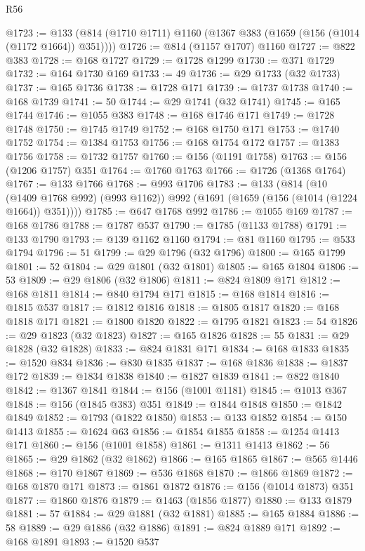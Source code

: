 \begin{lexlean}{R56}
\begin{coremodule}
{{{{{{{{{{{{{{{{{{{{{{{{{{{{{{{{{{{{{{{{{{{{{{{{{{{{{{{{{{{{{{{{{{{{{{{{{{{{{{{{{{{{{{{{{{{{{{{{{{{{{{{{{{{{{{{{{{{{{{{{{{{{{{{{{{{{{{{{{{{{{{{{{{{{{{{{{{{{{{{{{{{{{{{{{{{{{{{{{{{{{{{{{{{{{{{{{{{{{{{{{{{{{{{{{{{@1723 := @133 (@814 (@1710 @1711) @1160 (@1367 @383 (@1659 (@156 (@1014 (@1172 @1664)) @351))))
@1726 := @814 (@1157 @1707) @1160
@1727 := @822 @383
@1728 := @168 @1727
@1729 := @1728 @1299
@1730 := @371 @1729
@1732 := @164 @1730 @169
@1733 := 49
@1736 := @29 @1733 (@32 @1733)
@1737 := @165 @1736
@1738 := @1728 @171
@1739 := @1737 @1738
@1740 := @168 @1739
@1741 := 50
@1744 := @29 @1741 (@32 @1741)
@1745 := @165 @1744
@1746 := @1055 @383
@1748 := @168 @1746 @171
@1749 := @1728 @1748
@1750 := @1745 @1749
@1752 := @168 @1750 @171
@1753 := @1740 @1752
@1754 := @1384 @1753
@1756 := @168 @1754 @172
@1757 := @1383 @1756
@1758 := @1732 @1757
@1760 := @156 (@1191 @1758)
@1763 := @156 (@1206 @1757) @351
@1764 := @1760 @1763
@1766 := @1726 (@1368 @1764)
@1767 := @133 @1766
@1768 := @993 @1706
@1783 := @133
    (@814
      (@10 (@1409 @1768 @992) (@993 @1162))
      @992
      (@1691 (@1659 (@156 (@1014 (@1224 @1664)) @351))))
@1785 := @647 @1768 @992
@1786 := @1055 @169
@1787 := @168 @1786
@1788 := @1787 @537
@1790 := @1785 (@1133 @1788)
@1791 := @133 @1790
@1793 := @139 @1162 @1160
@1794 := @81 @1160
@1795 := @533 @1794
@1796 := 51
@1799 := @29 @1796 (@32 @1796)
@1800 := @165 @1799
@1801 := 52
@1804 := @29 @1801 (@32 @1801)
@1805 := @165 @1804
@1806 := 53
@1809 := @29 @1806 (@32 @1806)
@1811 := @824 @1809 @171
@1812 := @168 @1811
@1814 := @840 @1794 @171
@1815 := @168 @1814
@1816 := @1815 @537
@1817 := @1812 @1816
@1818 := @1805 @1817
@1820 := @168 @1818 @171
@1821 := @1800 @1820
@1822 := @1795 @1821
@1823 := 54
@1826 := @29 @1823 (@32 @1823)
@1827 := @165 @1826
@1828 := 55
@1831 := @29 @1828 (@32 @1828)
@1833 := @824 @1831 @171
@1834 := @168 @1833
@1835 := @1520 @834
@1836 := @830 @1835
@1837 := @168 @1836
@1838 := @1837 @172
@1839 := @1834 @1838
@1840 := @1827 @1839
@1841 := @822 @1840
@1842 := @1367 @1841
@1844 := @156 (@1001 @1181)
@1845 := @1013 @367
@1848 := @156 (@1845 @383) @351
@1849 := @1844 @1848
@1850 := @1842 @1849
@1852 := @1793 (@1822 @1850)
@1853 := @133 @1852
@1854 := @150 @1413
@1855 := @1624 @63
@1856 := @1854 @1855
@1858 := @1254 @1413 @171
@1860 := @156 (@1001 @1858)
@1861 := @1311 @1413
@1862 := 56
@1865 := @29 @1862 (@32 @1862)
@1866 := @165 @1865
@1867 := @565 @1446
@1868 := @170 @1867
@1869 := @536 @1868
@1870 := @1866 @1869
@1872 := @168 @1870 @171
@1873 := @1861 @1872
@1876 := @156 (@1014 @1873) @351
@1877 := @1860 @1876
@1879 := @1463 (@1856 @1877)
@1880 := @133 @1879
@1881 := 57
@1884 := @29 @1881 (@32 @1881)
@1885 := @165 @1884
@1886 := 58
@1889 := @29 @1886 (@32 @1886)
@1891 := @824 @1889 @171
@1892 := @168 @1891
@1893 := @1520 @537
}}}}}}}}}}}}}}}}}}}}}}}}}}}}}}}}}}}}}}}}}}}}}}}}}}}}}}}}}}}}}}}}}}}}}}}}}}}}}}}}}}}}}}}}}}}}}}}}}}}}}}}}}}}}}}}}}}}}}}}}}}}}}}}}}}}}}}}}}}}}}}}}}}}}}}}}}}}}}}}}}}}}}}}}}}}}}}}}}}}}}}}}}}}}}}}}}}}}}}}}}}}}}}}}}}}
\end{coremodule}
\end{lexlean}
